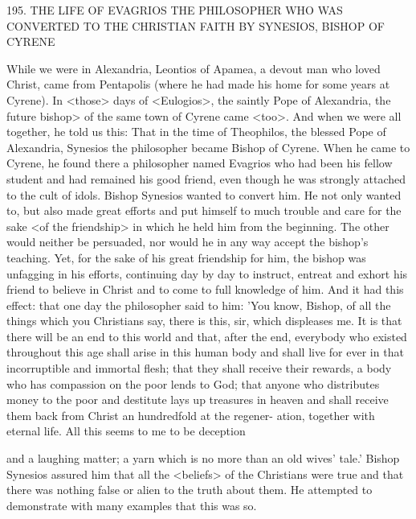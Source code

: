 195.
THE LIFE OF EVAGRIOS THE PHILOSOPHER
WHO WAS CONVERTED TO THE CHRISTIAN FAITH BY
SYNESIOS, BISHOP OF CYRENE

While we were in Alexandria, Leontios of Apamea, a devout man
who loved Christ, came from Pentapolis (where he had made his
home for some years at Cyrene).
In <those> days of <Eulogios>,
the saintly Pope of Alexandria, the future bishop> of the same town
of Cyrene came <too>.
And when we were all together, he told us
this:
That in the time of Theophilos, the blessed Pope of Alexandria,
Synesios the philosopher became Bishop of Cyrene.
When he came
to Cyrene, he found there a philosopher named Evagrios who had
been his fellow student and had remained his good friend, even
though he was strongly attached to the cult of idols.
Bishop
Synesios wanted to convert him.
He not only wanted to, but also
made great efforts and put himself to much trouble and care for the
sake <of the friendship> in which he held him from the beginning.
The other would neither be persuaded, nor would he in any way
accept the bishop's teaching.
Yet, for the sake of his great friendship
for him, the bishop was unfagging in his efforts, continuing day by
day to instruct, entreat and exhort his friend to believe in Christ and
to come to full knowledge of him.
And it had this effect: that one
day the philosopher said to him: 'You know, Bishop, of all the
things which you Christians say, there is this, sir, which displeases
me.
It is that there will be an end to this world and that, after the
end, everybody who existed throughout this age shall arise in this
human body and shall live for ever in that incorruptible and
immortal flesh; that they shall receive their rewards, a body who has
compassion on the poor lends to God; that anyone who distributes
money to the poor and destitute lays up treasures in heaven and
shall receive them back from Christ an hundredfold at the regener-
ation, together with eternal life.
All this seems to me to be deception

and a laughing matter; a yarn which is no more than an old wives'
tale.' Bishop Synesios assured him that all the <beliefs> of the
Christians were true and that there was nothing false or alien to the
truth about them.
He attempted to demonstrate with many examples
that this was so.

